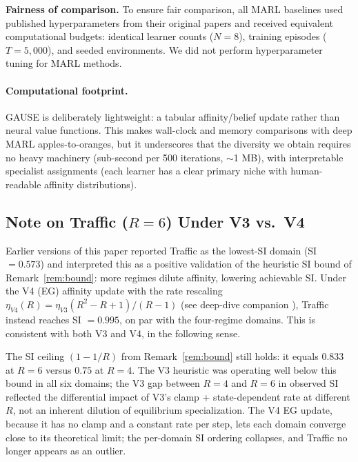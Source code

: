 \documentclass{article}
\begin{document}
\textbf{Fairness of comparison.} To ensure fair comparison, all MARL baselines used published hyperparameters from their original papers \cite{rashid2018qmix, yu2022surprising, tan1993multi} and received equivalent computational budgets: identical learner counts ($N = 8$), training episodes ($T = 5{,}000$), and seeded environments. We did not perform hyperparameter tuning for MARL methods.

\paragraph{Computational footprint.} GAUSE is deliberately lightweight: a tabular affinity/belief update rather than neural value functions. This makes wall-clock and memory comparisons with deep MARL apples-to-oranges, but it underscores that the diversity we obtain requires no heavy machinery (sub-second per 500 iterations, $\sim$1 MB), with interpretable specialist assignments (each learner has a clear primary niche with human-readable affinity distributions).

\subsection{Note on Traffic ($R = 6$) Under V3 vs.\ V4}
\label{sec:traffic_analysis}

Earlier versions of this paper reported Traffic as the lowest-SI domain
(SI $= 0.573$) and interpreted this as a positive validation of
the heuristic SI bound of Remark~\ref{rem:bound}: more regimes dilute affinity,
lowering achievable SI. Under the V4 (EG) affinity update with the rate rescaling
$\eta_{V4}(R) = \eta_{V3}(R^2 - R + 1)/(R-1)$ (see deep-dive companion
\cite{li2026emergent}), Traffic instead reaches SI $= 0.995$, on par
with the four-regime domains.
This is consistent with both V3 and V4, in the following sense.

The SI ceiling $(1 - 1/R)$ from Remark~\ref{rem:bound} still
holds: it equals $0.833$ at $R = 6$ versus $0.75$ at $R = 4$. The V3
heuristic was operating well below this bound in all six domains; the V3
gap between $R = 4$ and $R = 6$ in observed SI reflected the differential
impact of V3's clamp + state-dependent rate at different $R$, not an
inherent dilution of equilibrium specialization. The V4 EG update,
because it has no clamp and a constant rate per step, lets each domain
converge close to its theoretical limit; the per-domain SI ordering
collapses, and Traffic no longer appears as an outlier.
\end{document}
